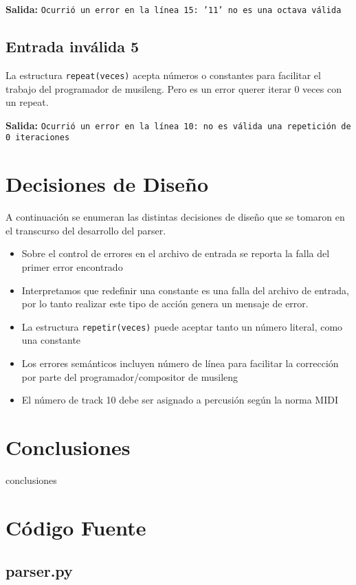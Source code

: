\documentclass[a4paper,8pt]{article}
\begin{document}
\textbf{Salida:} \texttt{Ocurrió un error en la línea 15: '11' no es una octava válida}

\subsection{Entrada inválida 5}
La estructura \texttt{repeat(veces)} acepta números o constantes para facilitar el trabajo del programador de musileng. Pero es un error querer iterar 0 veces con un repeat.
\begin{small}
  
\end{small}

\textbf{Salida:} \texttt{Ocurrió un error en la línea 10: no es válida una repetición de 0 iteraciones}

\newpage
\section{Decisiones de Diseño}
A continuación se enumeran las distintas decisiones de diseño que se tomaron en el transcurso del desarrollo del parser.
\begin{itemize}
\item Sobre el control de errores en el archivo de entrada se reporta la falla del primer error encontrado
\item Interpretamos que redefinir una constante es una falla del archivo de entrada, por lo tanto realizar este tipo de acción genera un mensaje de error.
\item La estructura \texttt{repetir(veces){}} puede aceptar tanto un número literal, como una constante
\item Los errores semánticos incluyen número de línea para facilitar la corrección por parte del programador/compositor de musileng
\item El número de track 10 debe ser asignado a percusión según la norma MIDI
\end{itemize}

\section{Conclusiones}
conclusiones

\newpage
\section{Código Fuente}

\subsection{parser.py}
\begin{small}
  
\end{small}
\newpage
\end{document}
